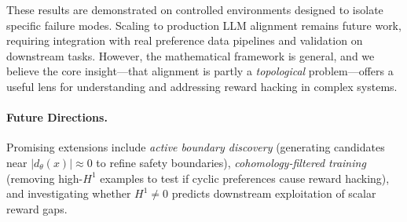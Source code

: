 These results are demonstrated on controlled environments designed to isolate specific failure modes. Scaling to production LLM alignment remains future work, requiring integration with real preference data pipelines and validation on downstream tasks. However, the mathematical framework is general, and we believe the core insight---that alignment is partly a \emph{topological} problem---offers a useful lens for understanding and addressing reward hacking in complex systems.

\paragraph{Future Directions.}
Promising extensions include \emph{active boundary discovery} (generating candidates near $|d_\theta(x)| \approx 0$ to refine safety boundaries), \emph{cohomology-filtered training} (removing high-$H^1$ examples to test if cyclic preferences cause reward hacking), and investigating whether $H^1 \neq 0$ predicts downstream exploitation of scalar reward gaps.

